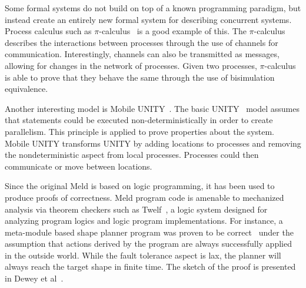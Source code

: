 Some formal systems do not build on top of a known programming paradigm, but instead
create an entirely new formal system for describing concurrent systems. Process calculus
such as $\pi$-calculus~\cite{Milner:1999:CMS:329902} is a good example of this.
The $\pi$-calculus describes the interactions between processes
through the use of channels for communication. Interestingly, channels can also be transmitted as
messages, allowing for changes in the network of processes.
Given two processes, $\pi$-calculus is able to prove that they behave the same through
the use of bisimulation equivalence.

Another interesting model is Mobile UNITY~\cite{Roman97anintroduction}. The basic UNITY~\cite{UNITY} model assumes that statements could be executed non-deterministically
in order to create parallelism. This principle is applied to prove properties about
the system.
Mobile UNITY transforms UNITY by adding locations to processes and removing the
nondeterministic aspect from local processes. Processes could then communicate or move
between locations.

Since the original Meld is based on logic programming, it has been used to produce proofs of correctness.
Meld program code is amenable to mechanized analysis via theorem checkers such as Twelf~\cite{twelf},
a logic system designed for analyzing program logics and logic program implementations.
For instance, a meta-module based shape planner program was proven to be correct~\cite{dewey-iros08,ashley-rollman-iclp09}
under the assumption that actions derived by the program are always successfully applied in the outside world.
While the fault tolerance aspect is lax, the planner will always reach the target shape in finite time.
The sketch of the proof is presented in Dewey et al~\cite{dewey-iros08}.
